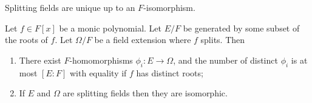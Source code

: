 \begin{theorem}
Splitting fields are unique up to an $F$-isomorphism.
\end{theorem}

\begin{theorem}
Let $f \in F[x]$ be a monic polynomial. Let $E/F$ be generated by some subset of the roots of $f$. Let $\Omega/F$ be a field extension where $f$ splits. Then 
\begin{enumerate}[label={\textup{(\alph*)}}]
\item There exist $F$-homomorphisms $\phi_i : E \to \Omega$, and the number of distinct $\phi_i$ is at most $[E : F]$ with equality if $f$ has distinct roots;
\item If $E$ and $\Omega$ are splitting fields then they are isomorphic.
\end{enumerate}
\end{theorem}